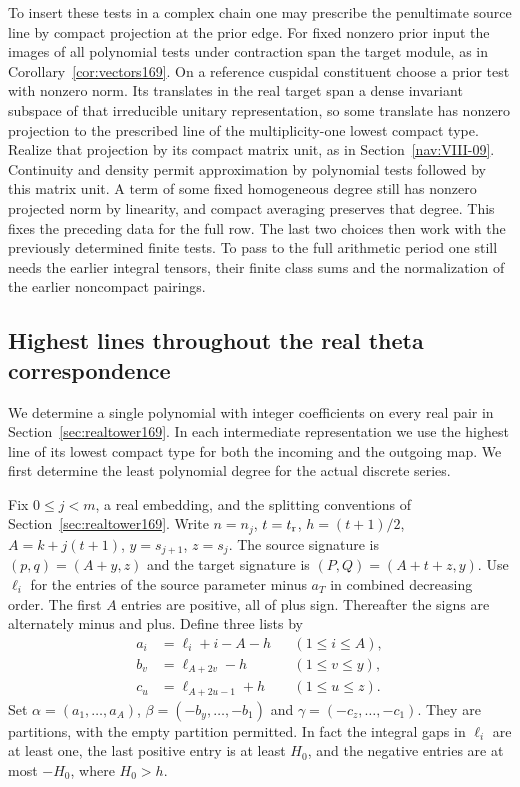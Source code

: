 \documentclass[a4paper,11pt]{article}
\theoremstyle{definition}
\theoremstyle{remark}
\numberwithin{equation}{section}
\begin{document}
To insert these tests in a complex chain one may prescribe
the penultimate source line by compact projection at the
prior edge. For fixed nonzero prior input the images of all
polynomial tests under contraction span the target module,
as in Corollary~\ref{cor:vectors169}. On a reference cuspidal
constituent choose a prior test with nonzero norm. Its
translates in the real target span a dense invariant
subspace of that irreducible unitary representation, so
some translate has nonzero projection to the prescribed
line of the multiplicity-one lowest compact type. Realize
that projection by its compact matrix unit, as in Section~\ref{nav:VIII-09}.
Continuity and density permit approximation by polynomial
tests followed by this matrix unit. A term of some fixed
homogeneous degree still has nonzero projected norm by
linearity, and compact averaging preserves that degree.
This fixes the preceding data for the full row. The last
two choices then work with the previously determined finite
tests. To pass to the full arithmetic period one still
needs the earlier integral tensors, their finite class sums
and the normalization of the earlier noncompact pairings.

\subsection{Highest lines throughout the real theta correspondence}\label{nav:VIII-11}
\label{sec:harmonic187}

We determine a single polynomial with integer coefficients on every
real pair in Section~\ref{sec:realtower169}. In each intermediate
representation we use the highest line of its lowest compact type
for both the incoming and the outgoing map. We first determine the
least polynomial degree for the actual discrete series.

Fix \(0\le j<m\), a real embedding, and the splitting conventions of
Section~\ref{sec:realtower169}. Write \(n=n_j\), \(t=t_{\rm r}\),
\(h=(t+1)/2\), \(A=k+j(t+1)\), \(y=s_{j+1}\), \(z=s_j\).
The source signature is \((p,q)=(A+y,z)\) and the target signature
is \((P,Q)=(A+t+z,y)\). Use \(\ell_i\) for the entries of the
source parameter minus \(a_T\) in combined decreasing order.
The first \(A\) entries are positive, all of plus sign. Thereafter
the signs are alternately minus and plus. Define three lists by
\begin{align*}
 a_i&=\ell_i+i-A-h &&(1\le i\le A),\\
 b_v&=\ell_{A+2v}-h &&(1\le v\le y),\\
 c_u&=\ell_{A+2u-1}+h &&(1\le u\le z).
\end{align*}
Set \(\alpha=(a_1,\ldots,a_A)\),
\(\beta=(-b_y,\ldots,-b_1)\) and
\(\gamma=(-c_z,\ldots,-c_1)\). They are partitions, with the empty
partition permitted. In fact the integral gaps in \(\ell_i\) are
at least one, the last positive entry is at least \(H_0\), and the
negative entries are at most \(-H_0\), where \(H_0>h\).
\end{document}
